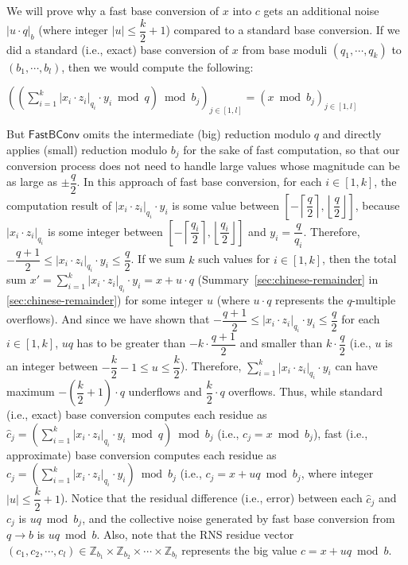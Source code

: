 \begin{myproof}

We will prove why a fast base conversion of $x$ into $c$ gets an additional noise $|u\cdot q|_b$ (where integer $|u| \leq \dfrac{k}{2}+1$) compared to a standard base conversion. If we did a standard (i.e., exact) base conversion of $x$ from base moduli $(q_1, \cdots, q_k)$ to $(b_1, \cdots, b_l)$, then we would compute the following:

$\left( \left( \sum\limits_{i=1}^{k} |x_i \cdot z_i|_{q_i} \cdot y_i \bmod q \right) \bmod {b_j} \right)_{j \in [1,l]} = \left( x \bmod {b_j} \right)_{j \in [1,l]}$

But $\textsf{FastBConv}$ omits the intermediate (big) reduction modulo $q$ and directly applies (small) reduction modulo $b_j$ for the sake of fast computation, so that our conversion process does not need to handle large values whose magnitude can be as large as $\pm\dfrac{q}{2}$. In this approach of fast base conversion, for each $i \in [1, k]$, the computation result of $|x_i \cdot z_i|_{q_i} \cdot y_i$ is some value between $\left[-\left\lceil\dfrac{q}{2}\right\rceil, \left\lfloor\dfrac{q}{2}\right\rfloor\right]$, because $|x_i \cdot z_i|_{q_i}$ is some integer between $\left[-\left\lceil\dfrac{q_i}{2}\right\rceil, \left\lfloor\dfrac{q_i}{2}\right\rfloor\right]$ and $y_i = \dfrac{q}{q_i}$. Therefore, $-\dfrac{q+1}{2} \leq |x_i \cdot z_i|_{q_i} \cdot y_i \leq \dfrac{q}{2}$. If we sum $k$ such values for $i \in [1, k]$, then the total sum $x' = \sum\limits_{i=1}^{k} |x_i \cdot z_i|_{q_i} \cdot y_i = x + u\cdot q$ (Summary~\ref*{sec:chinese-remainder} in \autoref{sec:chinese-remainder}) for some integer $u$ (where $u\cdot q$ represents the $q$-multiple overflows). And since we have shown that $-\dfrac{q+1}{2} \leq |x_i \cdot z_i|_{q_i} \cdot y_i \leq \dfrac{q}{2}$ for each $i \in [1, k]$, $uq$ has to be greater than $-k\cdot\dfrac{q+1}{2}$ and smaller than $k\cdot\dfrac{q}{2}$ (i.e., $u$ is an integer between $-\dfrac{k}{2} - 1 \leq u \leq \dfrac{k}{2}$). Therefore, $\sum\limits_{i=1}^{k} |x_i \cdot z_i|_{q_i} \cdot y_i$ can have maximum $-\left(\dfrac{k}{2} + 1\right)\cdot q$ underflows and $\dfrac{k}{2}\cdot q$ overflows. Thus, while standard (i.e., exact) base conversion computes each residue as $\hat{c}_j = \left(\sum\limits_{i=1}^{k} |x_i \cdot z_i|_{q_i} \cdot y_i \bmod q\right) \bmod {b_j}$ (i.e., $c_j = x \bmod {b_j}$), fast (i.e., approximate) base conversion computes each residue as $c_j = \left(\sum\limits_{i=1}^{k} |x_i \cdot z_i|_{q_i} \cdot y_i\right) \bmod b_j$ (i.e., $c_j = x + uq \bmod b_j$, where integer $|u| \leq \dfrac{k}{2} + 1$). Notice that the residual difference (i.e., error) between each $\hat{c}_j$ and $c_j$ is $uq \bmod b_j$, and the collective noise generated by fast base conversion from $q \rightarrow  b$ is  $uq \bmod b$. Also, note that the RNS residue vector $(c_1, c_2, \cdots, c_l) \in \mathbb{Z}_{b_1} \times \mathbb{Z}_{b_2} \times \cdots \times \mathbb{Z}_{b_l}$ represents the big value $c = x + uq \bmod b$. 


\end{myproof}
